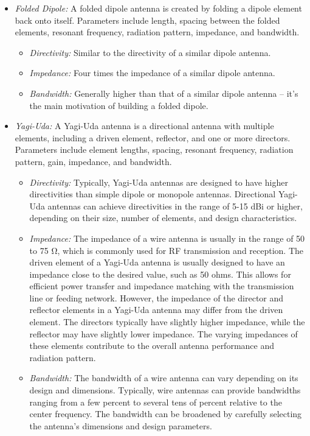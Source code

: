 \documentclass[11pt,a4paper]{article}
\renewcommand{\ohm}{{\mathrm{\Omega}}}
\begin{document}
\begin{itemize}
    \item \emph{Folded Dipole:} A folded dipole antenna is created by folding a dipole element back onto itself. Parameters include length, spacing between the folded elements, resonant frequency, radiation pattern, impedance, and bandwidth.
    \begin{itemize}
        \item \emph{Directivity:} Similar to the directivity of a similar dipole antenna.
        \item \emph{Impedance:} Four times the impedance of a similar dipole antenna.
        \item \emph{Bandwidth:} Generally higher than that of a similar dipole antenna -- it's the main motivation of building a folded dipole.
    \end{itemize}
    
    \item \emph{Yagi-Uda:} A Yagi-Uda antenna is a directional antenna with multiple elements, including a driven element, reflector, and one or more directors. Parameters include element lengths, spacing, resonant frequency, radiation pattern, gain, impedance, and bandwidth.
    \begin{itemize}
        \item \emph{Directivity:} Typically, Yagi-Uda antennas are designed to have higher directivities than simple dipole or monopole antennas. Directional Yagi-Uda antennas can achieve directivities in the range of 5-15 dBi or higher, depending on their size, number of elements, and design characteristics.
        \item \emph{Impedance:} The impedance of a wire antenna is usually in the range of 50 to 75 $\ohm$, which is commonly used for RF transmission and reception. The driven element of a Yagi-Uda antenna is usually designed to have an impedance close to the desired value, such as 50 ohms. This allows for efficient power transfer and impedance matching with the transmission line or feeding network. However, the impedance of the director and reflector elements in a Yagi-Uda antenna may differ from the driven element. The directors typically have slightly higher impedance, while the reflector may have slightly lower impedance. The varying impedances of these elements contribute to the overall antenna performance and radiation pattern.
        \item \emph{Bandwidth:} The bandwidth of a wire antenna can vary depending on its design and dimensions. Typically, wire antennas can provide bandwidths ranging from a few percent to several tens of percent relative to the center frequency. The bandwidth can be broadened by carefully selecting the antenna's dimensions and design parameters.
    \end{itemize}
    

\end{itemize}
\end{document}
